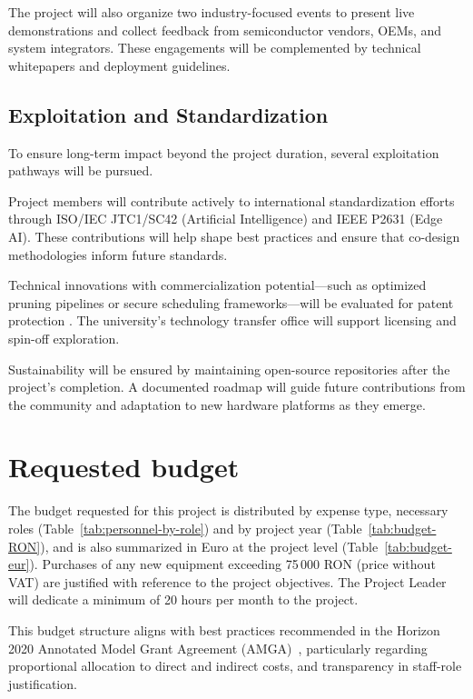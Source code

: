 The project will also organize two industry-focused events to present live demonstrations and collect feedback from semiconductor vendors, OEMs, and system integrators. These engagements will be complemented by technical whitepapers and deployment guidelines.

\subsection{Exploitation and Standardization}

To ensure long-term impact beyond the project duration, several exploitation pathways will be pursued.

Project members will contribute actively to international standardization efforts through ISO/IEC JTC1/SC42 (Artificial Intelligence) and IEEE P2631 (Edge AI). These contributions will help shape best practices and ensure that co-design methodologies inform future standards.

Technical innovations with commercialization potential—such as optimized pruning pipelines or secure scheduling frameworks—will be evaluated for patent protection \cite{Tuli2022codebench}. The university’s technology transfer office will support licensing and spin-off exploration.

Sustainability will be ensured by maintaining open-source repositories after the project’s completion. A documented roadmap will guide future contributions from the community and adaptation to new hardware platforms as they emerge.




\section{Requested budget}

The budget requested for this project is distributed by expense type, necessary roles (Table~\ref{tab:personnel-by-role}) and by project year (Table~\ref{tab:budget-RON}), and is also summarized in Euro at the project level (Table~\ref{tab:budget-eur}). Purchases of any new equipment exceeding 75\,000 RON (price without VAT) are justified with reference to the project objectives. The Project Leader will dedicate a minimum of 20 hours per month to the project.

This budget structure aligns with best practices recommended in the Horizon 2020 Annotated Model Grant Agreement (AMGA)~\cite{ec_amga2020}, particularly regarding proportional allocation to direct and indirect costs, and transparency in staff-role justification.

